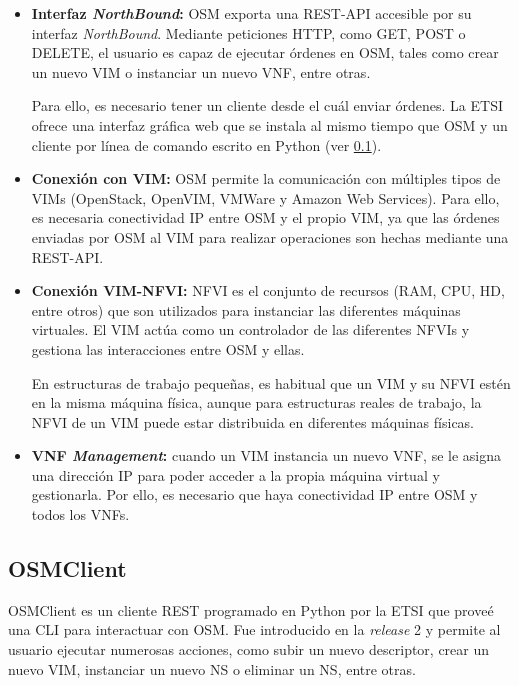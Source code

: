 \begin{itemize}
	\item \textbf{Interfaz \textit{NorthBound}:} \ac{OSM} exporta una \ac{REST}-\ac{API} accesible por su interfaz \textit{NorthBound}. Mediante peticiones \ac{HTTP}, como GET, POST o DELETE, el usuario es capaz de ejecutar órdenes en \ac{OSM}, tales como crear un nuevo \ac{VIM} o instanciar un nuevo \ac{VNF}, entre otras.
	
	Para ello, es necesario tener un cliente desde el cuál enviar órdenes. La \ac{ETSI} ofrece una interfaz gráfica web que se instala al mismo tiempo que \ac{OSM} y un cliente por línea de comando escrito en Python (ver \ref{subsec:osmclientpython}).
	
	\item \textbf{Conexión con \ac{VIM}:} \ac{OSM} permite la comunicación con múltiples tipos de \acp{VIM} (OpenStack, OpenVIM, VMWare y Amazon Web Services). Para ello, es necesaria conectividad \ac{IP} entre \ac{OSM} y el propio \ac{VIM}, ya que las órdenes enviadas por \ac{OSM} al \ac{VIM} para realizar operaciones son hechas mediante una \ac{REST}-\ac{API}.
	
	\item \textbf{Conexión \ac{VIM}-\ac{NFVI}:} \ac{NFVI} es el conjunto de recursos (\ac{RAM}, \ac{CPU}, \ac{HD}, entre otros) que son utilizados para instanciar las diferentes máquinas virtuales. El \ac{VIM} actúa como un controlador de las diferentes \acp{NFVI} y gestiona las interacciones entre \ac{OSM} y ellas.
	
	En estructuras de trabajo pequeñas, es habitual que un \ac{VIM} y su \ac{NFVI} estén en la misma máquina física, aunque para estructuras reales de trabajo, la \ac{NFVI} de un \ac{VIM} puede estar distribuida en diferentes máquinas físicas.
	
	\item \textbf{\ac{VNF} \textit{Management}:} cuando un \ac{VIM} instancia un nuevo \ac{VNF}, se le asigna una dirección \ac{IP} para poder acceder a la propia máquina virtual y gestionarla. Por ello, es necesario que haya conectividad \ac{IP} entre \ac{OSM} y todos los \acp{VNF}. 
\end{itemize}

\subsection{OSMClient}
\label{subsec:osmclientpython}

OSMClient\cite{osmclientbib} es un cliente \ac{REST} programado en Python por la \ac{ETSI} que proveé una \ac{CLI} para interactuar con \ac{OSM}. Fue introducido en la \textit{release} 2 y permite al usuario ejecutar numerosas acciones, como subir un nuevo descriptor, crear un nuevo \ac{VIM}, instanciar un nuevo \ac{NS} o eliminar un \ac{NS}, entre otras. 

